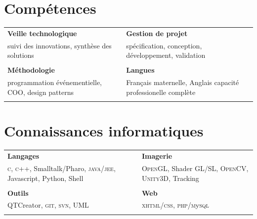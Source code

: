 \documentclass[9pt]{article}
\begin{document}
%
%
\hspace{-20pt}
\begin{minipage}[t]{0.47\textwidth}
	\vspace{-60pt} %
\section{Compétences}
	\begin{tabular}{p{}p{}}
		\textbf{\small Veille technologique} & \textbf{\small Gestion de projet} \\
		{\small suivi des innovations, synthèse des solutions} & 
		{\small spécification, conception, développement, validation} \\ & \\
	
		\textbf{\small Méthodologie} & \textbf{\small Langues} \\
		{\small programmation événementielle, COO, design patterns} & 
		{\small Fran\c cais maternelle, Anglais capacité professionelle complète} \\ & \\
	
	\end{tabular}
\end{minipage} %
%
%
\hspace{15pt}
\begin{minipage}{0.45\textwidth}
\section{Connaissances informatiques}
\begin{tabular}{p{}p{}}
	\textbf{\small Langages} & \textbf{\small Imagerie} \\
	{\small \textsc{c},  \textsc{c++}, Smalltalk/Pharo, \textsc{java/jee}, Javascript, Python, Shell} & 
	{\small \textsc{OpenGL}, Shader \textsc{GL/SL}, \textsc{OpenCV}, \textsc{Unity3D}, Tracking}\\ & \\
	\textbf{\small Outils} & \textbf{\small Web} \\
	{\small \textsc QTCreator, \textsc{git}, \textsc{svn}, {UML}} & 
	{\small \textsc{xhtml/css}, \textsc{php}/\textsc{m}y\textsc{sql}} \\ & 
\end{tabular}
\end{minipage} %
\end{document}
